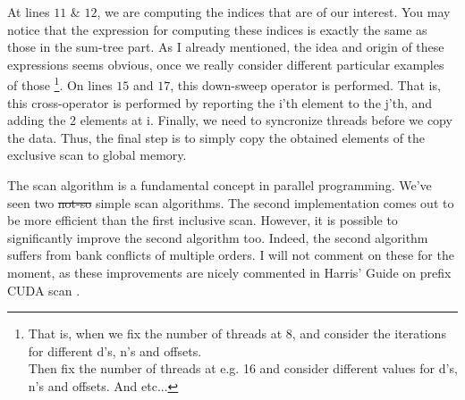 At lines $11$ \& $12$, we are computing the indices that are of our interest. You may notice that the 
expression for computing these indices is exactly the same as those in the sum-tree part. As I already 
mentioned, the idea and origin of these expressions seems obvious, once we really consider different 
particular examples of those \footnote{That is, when we fix the number of threads at 8, and consider the iterations for different d's, n's and offsets. \\
Then fix the number of threads at e.g. 16 and consider different values for d's, n's and offsets. And 
etc...}. On lines $15$ and $17$, this down-sweep operator is performed. That is, this cross-operator 
is performed by reporting the i'th element to the j'th, and adding the 2 elements at i.
Finally, we need to syncronize threads before we copy the data. Thus, the final step is to simply copy 
the obtained elements of the exclusive scan to global memory.


The scan algorithm is a fundamental concept in parallel programming. We've seen two \sout{not-so} simple scan algorithms. 
The second implementation comes out to be more efficient than the first inclusive scan. However, it is possible to significantly improve the 
second algorithm too. Indeed, the second algorithm suffers from bank conflicts of multiple orders. I will not comment on these for the moment, 
as these improvements are nicely commented in Harris' Guide on prefix CUDA scan \cite{harris_chapter_nodate}. 



























